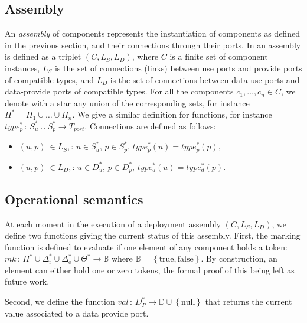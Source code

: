\subsection{Assembly}

An \emph{assembly} of components represents the instantiation of
components as defined in the previous section, and their connections
through their ports. In \mad an assembly is defined as a triplet
$(C, L_S, L_D)$, where $C$ is a finite set of component instances,
$L_S$ is the set of connections (links) between use ports and
provide ports of compatible types, and $L_D$ is the set of
connections between data-use ports and data-provide ports of
compatible types. For all the components $c_1,\dots,c_n \in C$, we
denote with a star any union of the corresponding sets, for instance
$\Pi^* = \Pi_1 \cup \dots \cup \Pi_n$. We give a similar definition
for functions, for instance
$type_{p}^*\,:\,S_{u}^*\cup S_{p}^*\rightarrow T_{port}$. Connections
are defined as follows:

\begin{itemize}
\item $\left(u,p\right)\ \in L_S,:\,u\in S_{u}^{*},\,p\in S_{p}^{*},\,type_{p}^{*}\left(u\right)=type_{p}^{*}\left(p\right)$,
\item $\left(u,p\right)\ \in L_D,:\,u\in D_{u}^{*},\,p\in D_{p}^{*},\,type_{d}^{*}\left(u\right)=type_{d}^{*}\left(p\right)$.
\end{itemize}

\subsection{Operational semantics}
\label{subsec:operational_semantics}

At each moment in the execution of a \mad deployment assembly
$(C, L_S, L_D)$, we define two functions giving the current
status of this assembly. First, the marking function is defined
to evaluate if one element of any component holds a token:
$mk\,:\,\Pi^{*}\cup\Delta_{i}^{*}\cup\Delta_{o}^{*}\cup\Theta^{*}\rightarrow\mathbb{B}$
where $\mathbb{B}=\left\{ \text{true},\text{false}\right\}$. By
construction, an element can either hold one or zero tokens, the
formal proof of this being left as future work.

Second, we define the function
$val\,:\,D_{P}^{*}\rightarrow \mathbb{D}\cup\left\{ \text{null}\right\}$
that returns the current value associated to a data provide port.

